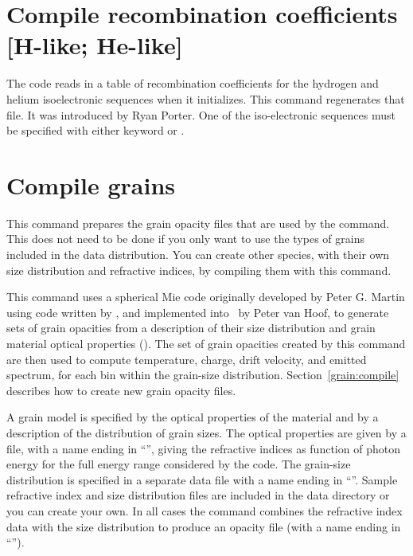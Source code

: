 \section{Compile recombination coefficients [H-like; He-like]}

The code reads in a table of recombination coefficients for the hydrogen and
helium isoelectronic sequences when it initializes.
This command regenerates that file.
It was
introduced by Ryan Porter.
One of the iso-electronic sequences must be
specified with either keyword  or .

\section{Compile grains}
\label{sec:CompileGrains}

This command prepares the grain opacity files that are used by the
 command.
This does not need to be done if you only want to use
the types of grains included in the data distribution.
You can create other species, with their own size
distribution and refractive indices, by compiling them with this command.

This command uses a spherical Mie code originally developed by Peter
G. Martin using code written by \citet{Hansen1974}, and implemented
into \Cloudy\ by Peter van Hoof, to generate sets of grain opacities from
a description of their size distribution and grain material optical
properties (\citealp{VanHoof2004}).
The set of grain opacities created by
this  command are then used to
compute temperature, charge, drift
velocity, and emitted spectrum, for each bin within the
grain-size distribution.
Section~\ref{grain:compile} describes how to create new grain opacity files.

A grain model is specified by the optical properties of the material
and by a description of the distribution of grain sizes.
The optical
properties are given by a file, with a name ending in ``'',
giving the
refractive indices as function of photon energy for the full energy range
considered by the code.
The grain-size distribution is specified in a
separate data file with a name ending in ``''.
Sample refractive index
and size distribution files are included in the data directory or you can
create your own.
In all cases the  command combines the refractive
index data with the size distribution to produce an opacity file
(with a name ending in ``'').

